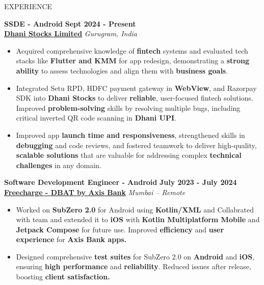 \documentclass{resume} %
\begin{document}
\begin{rSection}{EXPERIENCE}

\textbf{SSDE - Android } \hfill \textbf{Sept 2024 - Present}\\
\textbf{\href{https://www.linkedin.com/company/freecharge-in/}{Dhani Stocks Limited}}   \hfill \textit{Gurugram, India}
 \begin{itemize}
    \itemsep -3pt {} 
    \item Acquired comprehensive knowledge of \textbf{fintech} systems and evaluated tech stacks like \textbf{Flutter and KMM} for app redesign, demonstrating a \textbf{strong ability} to assess technologies and align them with \textbf{business goals}.
    
    \item Integrated Setu RPD, HDFC payment gateway in \textbf{WebView}, and Razorpay SDK into \textbf{Dhani Stocks} to deliver \textbf{reliable}, user-focused fintech solutions. Improved \textbf{problem-solving} skills by resolving multiple bugs, including critical inverted QR code scanning in \textbf{Dhani UPI}.
    
    \item Improved app \textbf{launch time and responsiveness}, strengthened skills in \textbf{debugging} and code reviews, and fostered teamwork to deliver high-quality, \textbf{scalable solutions} that are valuable for addressing complex \textbf{technical challenges} in any domain.
 \end{itemize}

\textbf{Software Development Engineer - Android } \hfill \textbf{July 2023 - July 2024}\\
\textbf{\href{https://www.linkedin.com/company/freecharge-in/}{Freecharge - DBAT by Axis Bank}}   \hfill \textit{Mumbai -- Remote}
 \begin{itemize}
    \itemsep -3pt {} 
    \item Worked on \textbf{SubZero 2.0} for Android using \textbf{Kotlin/XML} and Collabrated with team and extended it to \textbf{iOS} with \textbf{Kotlin Multiplatform Mobile} and \textbf{Jetpack Compose} for future use. Improved \textbf{efficiency} and \textbf{user experience} for \textbf{Axis Bank apps.}
    
    \item Designed comprehensive \textbf{test suites} for SubZero 2.0 on \textbf{Android} and \textbf{iOS}, ensuring \textbf{high performance} and \textbf{reliability}. Reduced issues after release, boosting \textbf{client satisfaction.}


\end{itemize}
\end{rSection}
\end{document}
